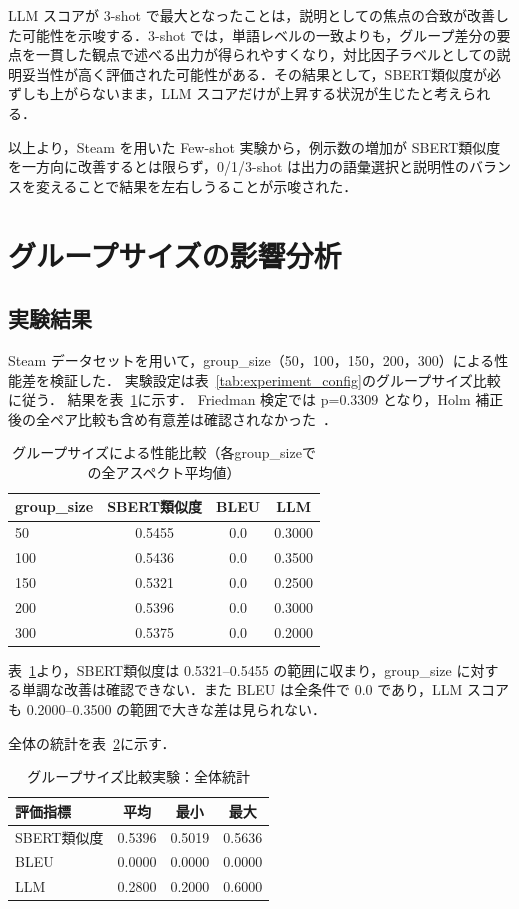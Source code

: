 LLM スコアが 3-shot で最大となったことは，説明としての焦点の合致が改善した可能性を示唆する．3-shot では，単語レベルの一致よりも，グループ差分の要点を一貫した観点で述べる出力が得られやすくなり，対比因子ラベルとしての説明妥当性が高く評価された可能性がある．その結果として，SBERT類似度が必ずしも上がらないまま，LLM スコアだけが上昇する状況が生じたと考えられる．

以上より，Steam を用いた Few-shot 実験から，例示数の増加が SBERT類似度 を一方向に改善するとは限らず，0/1/3-shot は出力の語彙選択と説明性のバランスを変えることで結果を左右しうることが示唆された．

\section{グループサイズの影響分析}
\label{sec:statistical_analysis}
\subsection{実験結果}
Steam データセットを用いて，group\_size（50，100，150，200，300）による性能差を検証した．
実験設定は表~\ref{tab:experiment_config}のグループサイズ比較に従う．
結果を表~\ref{tab:groupsize_results}に示す．
Friedman 検定では p=0.3309 となり，Holm 補正後の全ペア比較も含め有意差は確認されなかった~\cite{friedman1937use,holm1979simple}．
\begin{table}[htbp]
  \centering
  \caption{グループサイズによる性能比較（各group\_sizeでの全アスペクト平均値）}
  \label{tab:groupsize_results}
  \begin{tabular}{lccc}
    \toprule
    group\_size & SBERT類似度 & BLEU & LLM \\
    \midrule
    50 & 0.5455 & 0.0 & 0.3000 \\
    100 & 0.5436 & 0.0 & 0.3500 \\
    150 & 0.5321 & 0.0 & 0.2500 \\
    200 & 0.5396 & 0.0 & 0.3000 \\
    300 & 0.5375 & 0.0 & 0.2000 \\
    \bottomrule
  \end{tabular}
\end{table}

表~\ref{tab:groupsize_results}より，SBERT類似度は 0.5321--0.5455 の範囲に収まり，group\_size に対する単調な改善は確認できない．また BLEU は全条件で 0.0 であり，LLM スコアも 0.2000--0.3500 の範囲で大きな差は見られない．

全体の統計を表~\ref{tab:groupsize_overall_stats}に示す．
\begin{table}[htbp]
  \centering
  \caption{グループサイズ比較実験：全体統計}
  \label{tab:groupsize_overall_stats}
  \begin{tabular}{lccc}
    \toprule
    評価指標 & 平均 & 最小 & 最大 \\
    \midrule
    SBERT類似度 & 0.5396 & 0.5019 & 0.5636 \\
    BLEU & 0.0000 & 0.0000 & 0.0000 \\
    LLM & 0.2800 & 0.2000 & 0.6000 \\
    \bottomrule
  \end{tabular}
\end{table}

